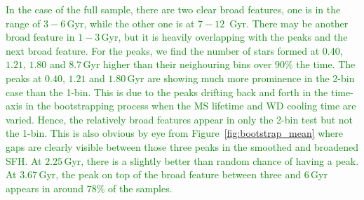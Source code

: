 \documentclass[fleqn,usenatbib]{mnras}
\begin{document}
\textcolor{green}{
In the case of the full sample, there are two clear broad features, one is
in the range of $3-6$\,Gyr, while the other one is at $7-12$\, Gyr. There
may be another broad feature in $1-3$\,Gyr, but it is heavily overlapping
with the peaks and the next broad feature. For the peaks, we find the number
of stars formed at $0.40$, $1.21$, $1.80$ and $8.7$\,Gyr higher than their
neighouring bins over $90\%$ the time. The peaks at $0.40$, $1.21$ and
$1.80$\,Gyr are showing much more prominence in the 2-bin case than the 1-bin.
This is due to the peaks drifting back and forth in the time-axis in the
bootstrapping process when the MS lifetime and WD cooling time are varied.
Hence, the relatively broad features appear in only the 2-bin test but not the
1-bin. This is also obvious by eye from Figure~\ref{fig:bootstrap_mean} where
gaps are clearly visible between those three peaks in the smoothed and
broadened SFH. At $2.25$\,Gyr, there is a slightly better than random chance
of having a peak. At $3.67$\,Gyr, the peak on top of the broad feature
between three and $6$\,Gyr appears in around $78\%$ of the samples.
}
\end{document}
